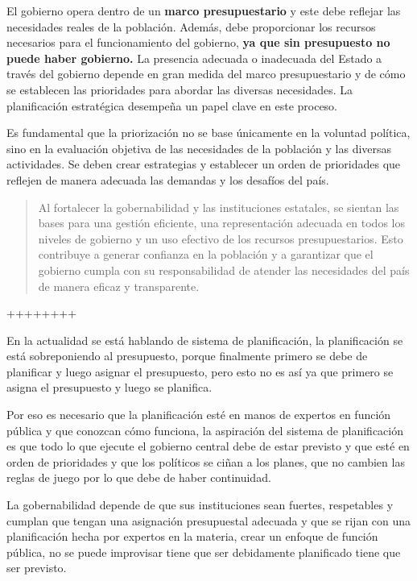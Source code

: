 \documentclass[
  jou,
  floatsintext,
  longtable,
  a4paper,
  nolmodern,
  notxfonts,
  notimes,
  12pt,
  colorlinks=true,linkcolor=blue,citecolor=blue,urlcolor=blue]{apa7}
\begin{document}
El gobierno opera dentro de un \textbf{marco presupuestario} y este debe
reflejar las necesidades reales de la población. Además, debe
proporcionar los recursos necesarios para el funcionamiento del
gobierno, \textbf{ya que sin presupuesto no puede haber gobierno.} La
presencia adecuada o inadecuada del Estado a través del gobierno depende
en gran medida del marco presupuestario y de cómo se establecen las
prioridades para abordar las diversas necesidades. La planificación
estratégica desempeña un papel clave en este proceso.

Es fundamental que la priorización no se base únicamente en la voluntad
política, sino en la evaluación objetiva de las necesidades de la
población y las diversas actividades. Se deben crear estrategias y
establecer un orden de prioridades que reflejen de manera adecuada las
demandas y los desafíos del país.

\begin{quote}
Al fortalecer la gobernabilidad y las instituciones estatales, se
sientan las bases para una gestión eficiente, una representación
adecuada en todos los niveles de gobierno y un uso efectivo de los
recursos presupuestarios. Esto contribuye a generar confianza en la
población y a garantizar que el gobierno cumpla con su responsabilidad
de atender las necesidades del país de manera eficaz y transparente.
\end{quote}

++++++++

En la actualidad se está hablando de sistema de planificación, la
planificación se está sobreponiendo al presupuesto, porque finalmente
primero se debe de planificar y luego asignar el presupuesto, pero esto
no es así ya que primero se asigna el presupuesto y luego se planifica.

Por eso es necesario que la planificación esté en manos de expertos en
función pública y que conozcan cómo funciona, la aspiración del sistema
de planificación es que todo lo que ejecute el gobierno central debe de
estar previsto y que esté en orden de prioridades y que los políticos se
ciñan a los planes, que no cambien las reglas de juego por lo que debe
de haber continuidad.

La gobernabilidad depende de que sus instituciones sean fuertes,
respetables y cumplan que tengan una asignación presupuestal adecuada y
que se rijan con una planificación hecha por expertos en la materia,
crear un enfoque de función pública, no se puede improvisar tiene que
ser debidamente planificado tiene que ser previsto.
\end{document}
